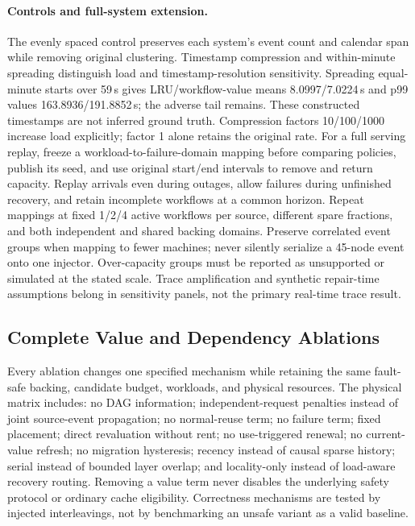 \documentclass[sigplan,10pt,anonymous,nonacm]{acmart}
\begin{document}
\paragraph{Controls and full-system extension.}
The evenly spaced control preserves each system's event count and
calendar span while removing original clustering. Timestamp compression
and within-minute spreading distinguish load and timestamp-resolution
sensitivity. Spreading equal-minute starts over 59\,s gives LRU/workflow-value
means 8.0997/7.0224\,s and p99 values 163.8936/191.8852\,s; the adverse
tail remains. These constructed timestamps are not inferred ground truth.
Compression
factors 10/100/1000 increase load explicitly; factor 1 alone retains the
original rate. For a full serving replay, freeze a workload-to-failure-domain
mapping before comparing policies, publish its seed, and use original
start/end intervals to remove and return capacity. Replay arrivals even
during outages, allow failures during unfinished recovery, and retain
incomplete workflows at a common horizon. Repeat mappings at fixed
1/2/4 active workflows per source, different spare fractions, and both
independent and shared backing domains. Preserve correlated event groups
when mapping to fewer machines; never silently serialize a 45-node event
onto one injector. Over-capacity groups must be reported as unsupported
or simulated at the stated scale. Trace amplification and synthetic
repair-time assumptions belong in sensitivity panels, not the primary
real-time trace result.

\FloatBarrier
\subsection{Complete Value and Dependency Ablations}

Every ablation changes one specified mechanism while retaining the same
fault-safe backing, candidate budget, workloads, and physical resources.
The physical matrix includes: no DAG information; independent-request
penalties instead of joint source-event propagation; no normal-reuse
term; no failure term; fixed placement; direct revaluation without rent;
no use-triggered renewal; no current-value refresh; no migration hysteresis;
recency instead of causal
sparse history; serial instead of bounded layer overlap; and locality-only
instead of load-aware recovery routing. Removing a value term never
disables the underlying safety protocol or ordinary cache eligibility.
Correctness mechanisms are tested by injected interleavings, not by
benchmarking an unsafe variant as a valid baseline.
\end{document}
